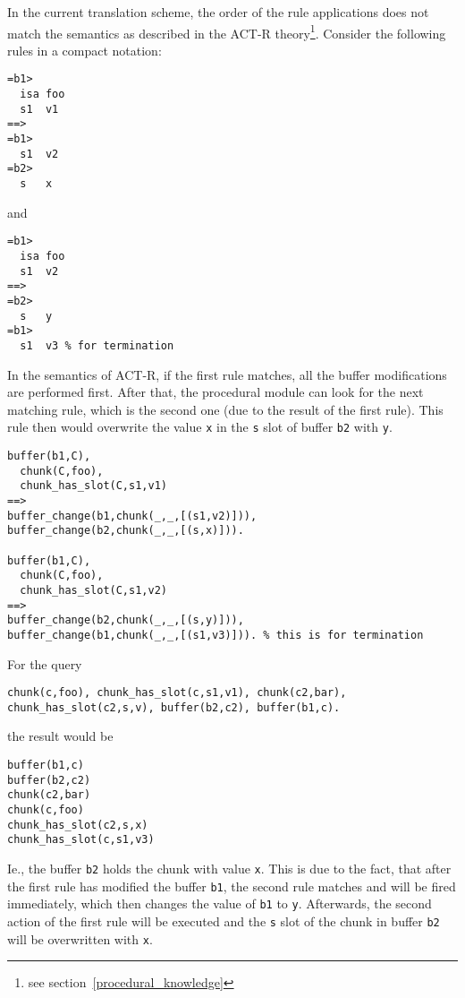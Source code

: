 In the current translation scheme, the order of the rule applications does not match the semantics as described in the ACT-R theory\footnote{see section~\ref{procedural_knowledge}}. Consider the following rules in a compact notation:

\begin{lstlisting}
=b1>
  isa foo
  s1  v1
==>
=b1>
  s1  v2
=b2>
  s   x
\end{lstlisting}

and

\begin{lstlisting}
=b1>
  isa foo
  s1  v2
==>
=b2>
  s   y
=b1>
  s1  v3 % for termination
\end{lstlisting}

In the semantics of ACT-R, if the first rule matches, all the buffer modifications are performed first. After that, the procedural module can look for the next matching rule, which is the second one (due to the result of the first rule). This rule then would overwrite the value \verb|x| in the \verb|s| slot of buffer \verb|b2| with \verb|y|.

\begin{lstlisting}
buffer(b1,C),
  chunk(C,foo),
  chunk_has_slot(C,s1,v1)
==>
buffer_change(b1,chunk(_,_,[(s1,v2)])),
buffer_change(b2,chunk(_,_,[(s,x)])).

buffer(b1,C),
  chunk(C,foo),
  chunk_has_slot(C,s1,v2)
==>
buffer_change(b2,chunk(_,_,[(s,y)])),
buffer_change(b1,chunk(_,_,[(s1,v3)])). % this is for termination
\end{lstlisting}

For the query

\begin{lstlisting}
chunk(c,foo), chunk_has_slot(c,s1,v1), chunk(c2,bar), chunk_has_slot(c2,s,v), buffer(b2,c2), buffer(b1,c).
\end{lstlisting}

the result would be

\begin{lstlisting}
buffer(b1,c)
buffer(b2,c2)
chunk(c2,bar)
chunk(c,foo)
chunk_has_slot(c2,s,x)
chunk_has_slot(c,s1,v3)
\end{lstlisting}

Ie., the buffer \verb|b2| holds the chunk with value \verb|x|. This is due to the fact, that after the first rule has modified the buffer \verb|b1|, the second rule matches and will be fired immediately, which then changes the value of \verb|b1| to \verb|y|. Afterwards, the second action of the first rule will be executed and the \verb|s| slot of the chunk in buffer \verb|b2| will be overwritten with \verb|x|.

